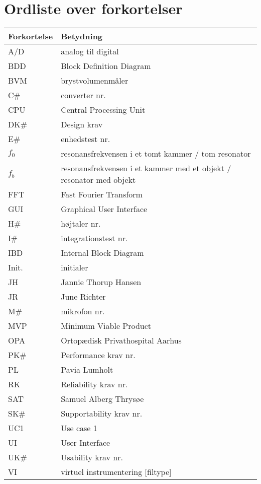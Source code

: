 \section*{Ordliste over forkortelser}

\vspace{1cm}
\begin{table}[hbt]
\centering
\label{ordliste}
\begin{tabular}{|l|l|}
\hline
\textbf{Forkortelse             } & \textbf{Betydning             } \\ \hline
A/D & analog til digital \\ \hline
BDD & Block Definition Diagram \\ \hline
BVM & brystvolumenmåler \\ \hline
C\# & converter nr. \\ \hline
CPU & Central Processing Unit \\ \hline
DK\# & Design krav \\ \hline
E\# & enhedstest nr. \\ \hline
$f_{0}$ & resonansfrekvensen i et tomt kammer / tom resonator \\ \hline 
$f_{b}$ & resonansfrekvensen i et kammer med et objekt / resonator med objekt \\ \hline
FFT & Fast Fourier Transform \\ \hline 
GUI & Graphical User Interface \\ \hline
H\# & højtaler nr. \\ \hline
I\# & integrationstest nr. \\ \hline
IBD & Internal Block Diagram \\ \hline 
Init. & initialer \\ \hline 
JH & Jannie Thorup Hansen \\ \hline
JR & June Richter  \\ \hline
M\# & mikrofon nr. \\ \hline
MVP & Minimum Viable Product \\ \hline
OPA & Ortopædisk Privathospital Aarhus \\ \hline
PK\# & Performance krav nr. \\ \hline
PL & Pavia Lumholt \\ \hline
RK & Reliability krav nr. \\ \hline
SAT & Samuel Alberg Thrysøe \\ \hline
SK\# & Supportability krav nr. \\ \hline 
UC1 & Use case 1 \\ \hline
UI & User Interface \\ \hline
UK\# & Usability krav nr. \\ \hline
VI & virtuel instrumentering [filtype] \\ \hline
\end{tabular}
\end{table}